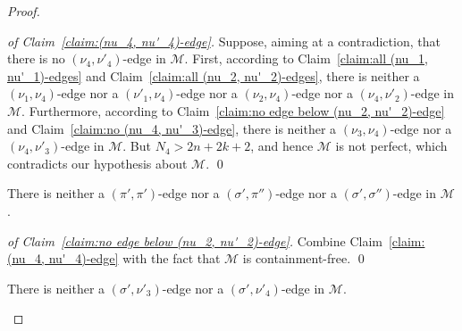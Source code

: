 \documentclass[a4paper]{llncs}
\begin{document}
\begin{proof}
  \begin{proof}[of Claim~\ref{claim:(nu_4, nu'_4)-edge}]
    Suppose, aiming at a contradiction, that there is no
    $(\nu_4, \nu'_4)$-edge in $\mathcal{M}$.
    First, according to
    Claim~\ref{claim:all (nu_1, nu'_1)-edges} and
    Claim~\ref{claim:all (nu_2, nu'_2)-edges},
    there is neither a $(\nu_1, \nu_4)$-edge
    nor a $(\nu'_1, \nu_4)$-edge
    nor a $(\nu_2, \nu_4)$-edge
    nor a $(\nu_4, \nu'_2)$-edge in $\mathcal{M}$.
    Furthermore, according to
    Claim~\ref{claim:no edge below (nu_2, nu'_2)-edge} and
    Claim~\ref{claim:no (nu_4, nu'_3)-edge},
    there is neither a $(\nu_3, \nu_4)$-edge
    nor a $(\nu_4, \nu'_3)$-edge in $\mathcal{M}$.
    But $N_4 > 2n + 2k + 2$, and
    hence $\mathcal{M}$ is not perfect,
    which contradicts our hypothesis about $\mathcal{M}$.
    \qed
  \end{proof}

  \begin{claim}
    \label{claim:no edge below (nu_4, nu'_4)-edge}
    There is
    neither a $(\pi', \pi')$-edge
    nor a $(\sigma', \pi'')$-edge
    nor a $(\sigma', \sigma'')$-edge
    in $\mathcal{M}$.
  \end{claim}

  \begin{proof}[of Claim~\ref{claim:no edge below (nu_2, nu'_2)-edge}]
    Combine Claim~\ref{claim:(nu_4, nu'_4)-edge} with the
    fact that $\mathcal{M}$ is containment-free.
    \qed
  \end{proof}

  \begin{claim}
    \label{claim:no (sigma', nu'_3)-edge, no (sigma', nu'_4)-edge}
    There is neither a $(\sigma', \nu'_3)$-edge
    nor a $(\sigma', \nu'_4)$-edge in $\mathcal{M}$.
  \end{claim}


\end{proof}
\end{document}
